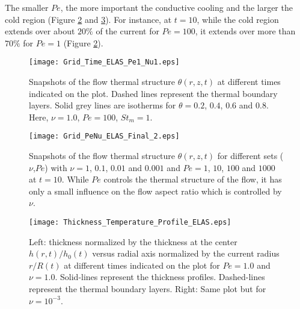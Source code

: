 The smaller  $Pe$, the more  important the conductive cooling  and the
larger   the   cold   region   (Figure   \ref{C3-Grid_PeNu_ELAS}   and
\ref{C3-Thickness_Temperature_Profile_ELAS}).    For    instance,   at
$t=10$, while the cold region extends over about $20\%$ of the current
for  $Pe=100$, it  extends over  more than  $70\%$ for  $Pe=1$ (Figure
\ref{C3-Grid_PeNu_ELAS}).

\begin{figure}[h!]
  \begin{center}
    \graphicspath{ {/Users/thorey/Documents/These/Projet/Refroidissement/Skin_Model/Figure/JFM_V13/} }
    \texttt{[image: Grid\_Time\_ELAS\_Pe1\_Nu1.eps]}
    \caption{Snapshots of  the flow thermal  structure $\theta(r,z,t)$
      at  different  times  indicated   on  the  plot.   Dashed  lines
      represent  the thermal  boundary  layers. Solid  grey lines  are
      isotherms for  $\theta =  0.2$, $0.4$,  $0.6$ and  $0.8$.  Here,
      $\nu=1.0$, $Pe =100$, $St_m = 1$.}
    \label{C3-Grid_Time_ELAS}
  \end{center}
\end{figure}

\begin{figure}[h!]
  \begin{center}
    \graphicspath{ {/Users/thorey/Documents/These/Projet/Refroidissement/Skin_Model/Figure/JFM_V13/} }
    \texttt{[image: Grid\_PeNu\_ELAS\_Final\_2.eps]}
    \caption{Snapshots of  the flow thermal  structure $\theta(r,z,t)$
      for different sets ($\nu$,$Pe$) with $\nu= 1$, $0.1$, $0.01$ and
      $0.001$ and  $Pe=1$, $10$,  $100$ and  $1000$ at  $t=10$.  While
      $Pe$ controls the  thermal structure of the flow, it  has only a
      small influence on the flow  aspect ratio which is controlled by
      $\nu$.}
    \label{C3-Grid_PeNu_ELAS}
  \end{center}
\end{figure}

\begin{figure}[h!]
  \begin{center}
    \graphicspath{ {/Users/thorey/Documents/These/Projet/Refroidissement/Skin_Model/Figure/JFM_V13/} }
    \texttt{[image: Thickness\_Temperature\_Profile\_ELAS.eps]}
    \caption{Left: thickness normalized by the thickness at the center
      $h(r,t)/h_0(t)$  versus radial  axis normalized  by the  current
      radius $r/R(t)$  at different  times indicated  on the  plot for
      $Pe=1.0$  and $\nu=1.0$.   Solid-lines  represent the  thickness
      profiles.  Dashed-lines  represent the thermal  boundary layers.
      Right: Same plot but for $\nu=10^{-3}$.}
    \label{C3-Thickness_Temperature_Profile_ELAS}
  \end{center}
\end{figure}



